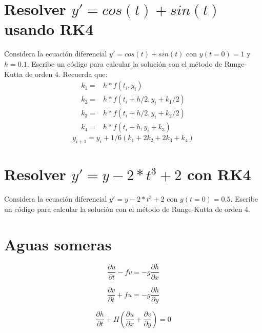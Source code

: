 \documentclass{article}
\newcommand\pder[2]{\ensuremath {\dfrac{\partial#1}{\partial#2}}}
\begin{document}
\section{Resolver \texorpdfstring{$y' = cos(t)+sin(t)$}{y' = cos(t)+ ...} usando RK4}
Considera la ecuación diferencial $y' = cos(t) +sin(t)$ con $y(t=0) = 1$ y $h=0.1$.
Escribe un código
para calcular la solución con el método de Runge-Kutta de orden 4.
Recuerda que:
\begin{equation}
    \begin{split}
    k_1 = & h*f(t_i, y_i)\\
    k_2 = & h*f(t_i + h/2, y_i + k_1/2)\\
    k_3 = & h*f(t_i + h/2, y_i + k_2/2)\\
    k_4 = & h*f(t_i + h, y_i + k_3)
    \end{split}
    \nonumber
\end{equation}
\begin{equation}
    y_{i+1} = y_i + 1/6(k_1 + 2k_2 + 2k_3 + k_4)
    \label{eq:rec}
    \nonumber
\end{equation}




\section{Resolver \texorpdfstring{$y'=y- 2*t^3 + 2$}{y'=y  2*t ...} con RK4}
Considera la ecuación diferencial $y' = y- 2*t^3 + 2$ con $y(t=0) = 0.5$.
Escribe un código para
calcular la solución con el método de Runge-Kutta de orden 4.




\section{Aguas someras}

\begin{equation}
	\pder{u}{t} - fv = -g \pder{h}{x}
	\label{eq:uno}
\end{equation}

\begin{equation}
	\pder{v}{t} + fu = -g \pder{h}{y}
	\label{eq:dos}
\end{equation}

\begin{equation}
	\pder{h}{t} + H\left( \pder{u}{x} + \pder{v}{y} \right) = 0
	\label{eq:continuidad}%
\end{equation}
\end{document}
